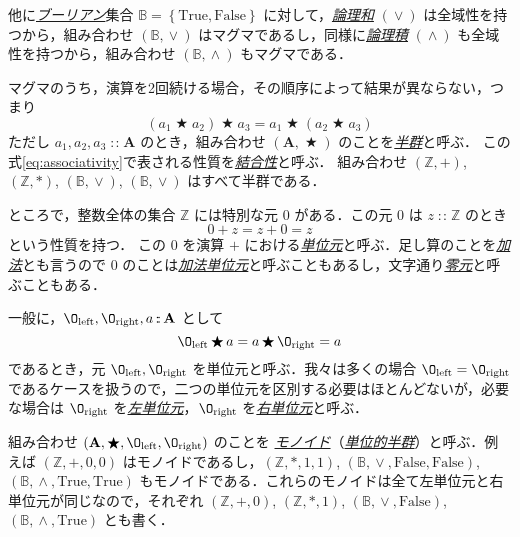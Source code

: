 \documentclass[a4paper,draft]{jsbook}
\newcommand{\keyword}[1]{{\underline{\emph{#1}}}}
\newcommand{\mSpecialConst}[1]{\mathrm{#1}} %
\newcommand{\mTrue}{\mSpecialConst{True}}
\newcommand{\mFalse}{\mSpecialConst{False}}
\newcommand{\mZero}{\O}
\newcommand{\mSpecialSub}[1]{\text{#1}}
\newcommand{\mLeft}{\mSpecialSub{left}}
\newcommand{\mRight}{\mSpecialSub{right}}
\newcommand{\mSet}[1]{\mathbf{#1}}
\newcommand{\mSpecialSet}[1]{\mathbb{#1}} %
\newcommand{\mZSet}{\mSpecialSet{Z}}
\newcommand{\mBSet}{\mSpecialSet{B}}
\newcommand{\mSetWith}[1]{\left\{#1\right\}}
\newcommand{\mTupleWith}[1]{\left(#1\right)}
\DeclareMathOperator{\mIn}{{:\!:}}
\DeclareMathOperator{\mBinOp}{\bigstar}
\DeclareMathOperator{\mLogicalAnd}{\wedge}
\DeclareMathOperator{\mLogicalOr}{\vee}
\newcommand{\mathSet}[1]{\mathbf{#1}} %
\begin{document}
他に\keyword{ブーリアン}集合 $\mBSet=\mSetWith{\mTrue,\mFalse}$ に対して，\keyword{論理和} $(\mLogicalOr)$ は全域性を持つから，組み合わせ $\mTupleWith{\mBSet,\mLogicalOr}$ はマグマであるし，同様に\keyword{論理積} $(\mLogicalAnd)$ も全域性を持つから，組み合わせ $\mTupleWith{\mBSet,\mLogicalAnd}$ もマグマである．

マグマのうち，演算を2回続ける場合，その順序によって結果が異ならない，つまり
\begin{equation}
\label{eq:associativity}
\left(a_1\mBinOp a_2\right)\mBinOp a_3
=a_1\mBinOp\left(a_2\mBinOp{a_3}\right)
\end{equation}
ただし $a_1,a_2,a_3\mIn\mSet{A}$ のとき，組み合わせ $\mTupleWith{\mathSet{A},\mBinOp}$ のことを\keyword{半群}と呼ぶ．
この式\eqref{eq:associativity}で表される性質を\keyword{結合性}と呼ぶ．
組み合わせ $\mTupleWith{\mZSet,+}$, $\mTupleWith{\mZSet,*}$, $\mTupleWith{\mBSet,\mLogicalOr}$, $\mTupleWith{\mBSet,\mLogicalOr}$ はすべて半群である．

ところで，整数全体の集合 $\mZSet$ には特別な元 $0$ がある．この元 $0$ は $z\mIn\mZSet$ のとき
\begin{equation}
0+z=z+0=z
\end{equation}
という性質を持つ．
この $0$ を演算 $+$ における\keyword{単位元}と呼ぶ．足し算のことを\keyword{加法}とも言うので $0$ のことは\keyword{加法単位元}と呼ぶこともあるし，文字通り\keyword{零元}と呼ぶこともある．

一般に，$\mZero_\mLeft,\mZero_\mRight,a\mIn\mSet{A}$ として
\begin{equation}
\label{eq:identity}
\mZero_\mLeft\mBinOp a=a\mBinOp\mZero_\mRight=a
\end{equation}
であるとき，元 $\mZero_\mLeft,\mZero_\mRight$ を単位元と呼ぶ．我々は多くの場合 $\mZero_\mLeft=\mZero_\mRight$ であるケースを扱うので，二つの単位元を区別する必要はほとんどないが，必要な場合は $\mZero_\mRight$ を\keyword{左単位元}，$\mZero_\mRight$ を\keyword{右単位元}と呼ぶ．

組み合わせ $\mTupleWith{\mSet{A},\mBinOp,\mZero_\mLeft,\mZero_\mRight}$ のことを
\keyword{モノイド}（\keyword{単位的半群}）と呼ぶ．例えば $\mTupleWith{\mZSet,+,0,0}$ はモノイドであるし，$\mTupleWith{\mZSet,*,1,1}$, $\mTupleWith{\mBSet,\mLogicalOr,\mFalse,\mFalse}$, $\mTupleWith{\mBSet,\mLogicalAnd,\mTrue,\mTrue}$ もモノイドである．これらのモノイドは全て左単位元と右単位元が同じなので，それぞれ $\mTupleWith{\mZSet,+,0}$, $\mTupleWith{\mZSet,*,1}$, $\mTupleWith{\mBSet,\mLogicalOr,\mFalse}$, $\mTupleWith{\mBSet,\mLogicalAnd,\mTrue}$ とも書く．
\end{document}
